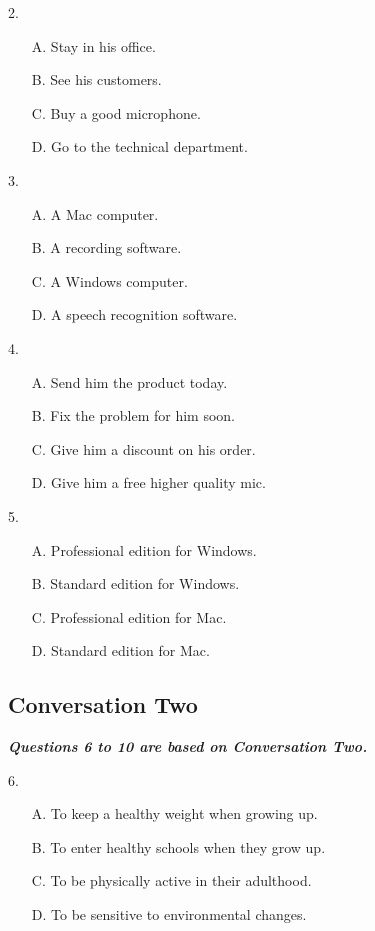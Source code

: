 \documentclass[UTF8,11pt]{ctexart}
\begin{document}
2.


\begin{itemize}[leftmargin=2em,itemsep=.2em,topsep=.4em]\item[A.] Stay in his office.
\item[B.] See his customers.
\item[C.] Buy a good microphone.
\item[D.] Go to the technical department.
\end{itemize}

3.


\begin{itemize}[leftmargin=2em,itemsep=.2em,topsep=.4em]\item[A.] A Mac computer.
\item[B.] A recording software.
\item[C.] A Windows computer.
\item[D.] A speech recognition software.
\end{itemize}

4.


\begin{itemize}[leftmargin=2em,itemsep=.2em,topsep=.4em]\item[A.] Send him the product today.
\item[B.] Fix the problem for him soon.
\item[C.] Give him a discount on his order.
\item[D.] Give him a free higher quality mic.
\end{itemize}

5.


\begin{itemize}[leftmargin=2em,itemsep=.2em,topsep=.4em]\item[A.] Professional edition for Windows.
\item[B.] Standard edition for Windows.
\item[C.] Professional edition for Mac.
\item[D.] Standard edition for Mac.
\end{itemize}

\subsection*{\textbf{Conversation Two}}


\textbf{\textit{Questions 6 to 10 are based on Conversation Two.}}


6.


\begin{itemize}[leftmargin=2em,itemsep=.2em,topsep=.4em]\item[A.] To keep a healthy weight when growing up.
\item[B.] To enter healthy schools when they grow up.
\item[C.] To be physically active in their adulthood.
\item[D.] To be sensitive to environmental changes.
\end{itemize}
\end{document}
